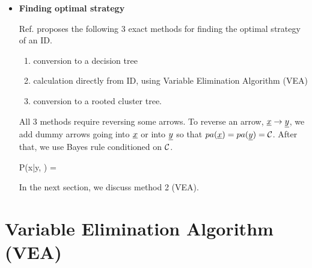\begin{itemize}
\item {\bf Finding optimal strategy }


Ref.\cite{sha-influ-diag} proposes the following 3 exact methods for
finding the optimal strategy of an ID.
\begin{enumerate}
\item conversion to a decision
tree
\item calculation directly from ID, using Variable
Elimination Algorithm (VEA)
\item conversion to a rooted cluster tree.
\end{enumerate}

All 3 methods require  reversing some arrows. To reverse
an arrow, $\rvx\rarrow \rvy$, we add dummy arrows going into $\rvx$ or into
$\rvy$ so that $pa(\rvx)=pa(\rvy)= \calc$. After that, we use Bayes rule conditioned on ${\cal C}$.


\beq
P(x|y, \calc) = 
\eeq




In the next section,
we discuss method 2 (VEA).

\end{itemize}

\section{Variable Elimination Algorithm (VEA)}


